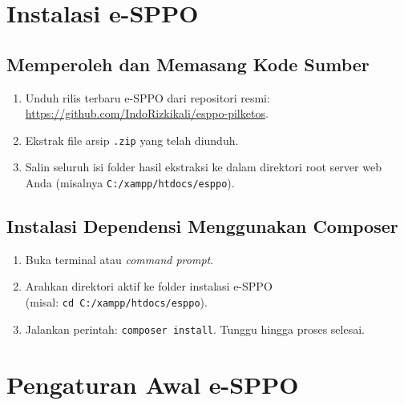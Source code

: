 \section{Instalasi e-SPPO}
\label{sec:instalasi_esppo}
\subsection{Memperoleh dan Memasang Kode Sumber}
\begin{enumerate}
	\item Unduh rilis terbaru e-SPPO dari repositori resmi: \url{https://github.com/IndoRizkikali/esppo-pilketos}.
	\item Ekstrak file arsip \texttt{.zip} yang telah diunduh.
	\item Salin seluruh isi folder hasil ekstraksi ke dalam direktori root server web Anda (misalnya \texttt{C:/xampp/htdocs/esppo}).
\end{enumerate}

\subsection{Instalasi Dependensi Menggunakan Composer}
\begin{enumerate}
	\item Buka terminal atau \textit{command prompt}.
	\item Arahkan direktori aktif ke folder instalasi e-SPPO \\(misal: \texttt{cd C:/xampp/htdocs/esppo}).
	\item Jalankan perintah: \texttt{composer install}. Tunggu hingga proses selesai.
\end{enumerate}

\section{Pengaturan Awal e-SPPO}
\label{sec:pengaturan_awal}

